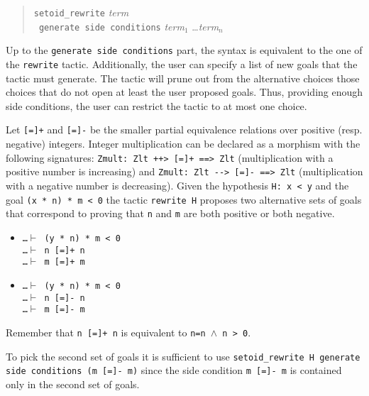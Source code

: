 \begin{verse}
  \texttt{setoid\_rewrite}  \textit{term}
  \\
  \texttt{~generate side conditions}
  \textit{term}$_1$ \ldots \textit{term}$_n$\\
\end{verse}
Up to the \texttt{generate side conditions} part, the syntax is 
equivalent to the
one of the \texttt{rewrite} tactic. Additionally, the user can specify a list
of new goals that the tactic must generate. The tactic will prune out from
the alternative choices those choices that do not open at least the user
proposed goals. Thus, providing enough side conditions, the user can restrict
the tactic to at most one choice.

\begin{cscexample}
Let \texttt{[=]+} and \texttt{[=]-} be the smaller partial equivalence
relations over positive (resp. negative) integers. Integer multiplication
can be declared as a morphism with the following signatures:
\texttt{Zmult: Zlt ++> [=]+ ==> Zlt} (multiplication with a positive number
is increasing) and
\texttt{Zmult: Zlt -{}-> [=]- ==> Zlt} (multiplication with a negative number
is decreasing).
Given the hypothesis \texttt{H: x < y} and the goal
\texttt{(x * n) * m < 0} the tactic \texttt{rewrite H} proposes
two alternative sets of goals that correspond to proving that \texttt{n}
and \texttt{m} are both positive or both negative.
\begin{itemize}
 \item \texttt{\ldots $\vdash$ (y * n) * m < 0}\\
       \texttt{\ldots $\vdash$ n [=]+ n}\\
       \texttt{\ldots $\vdash$ m [=]+ m}\\
 \item \texttt{\ldots $\vdash$ (y * n) * m < 0}\\
       \texttt{\ldots $\vdash$ n [=]- n} \\
       \texttt{\ldots $\vdash$ m [=]- m}
\end{itemize}
Remember that \texttt{n [=]+ n} is equivalent to \texttt{n=n $\land$ n > 0}.

To pick the second set of goals it is sufficient to use
\texttt{setoid\_rewrite H generate side conditions (m [=]- m)}
since the side condition \texttt{m [=]- m} is contained only in the second set
of goals.
\end{cscexample}

